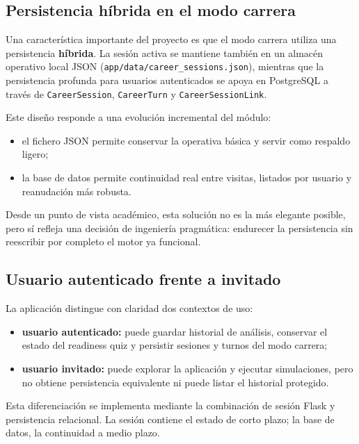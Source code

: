 \subsection{Persistencia híbrida en el modo carrera}

Una característica importante del proyecto es que el modo carrera utiliza una persistencia \textbf{híbrida}. La sesión activa se mantiene también en un almacén operativo local JSON (\texttt{app/data/career\_sessions.json}), mientras que la persistencia profunda para usuarios autenticados se apoya en PostgreSQL a través de \texttt{CareerSession}, \texttt{CareerTurn} y \texttt{CareerSessionLink}.

Este diseño responde a una evolución incremental del módulo:

\begin{itemize}
    \item el fichero JSON permite conservar la operativa básica y servir como respaldo ligero;
    \item la base de datos permite continuidad real entre visitas, listados por usuario y reanudación más robusta.
\end{itemize}

Desde un punto de vista académico, esta solución no es la más elegante posible, pero sí refleja una decisión de ingeniería pragmática: endurecer la persistencia sin reescribir por completo el motor ya funcional.

\subsection{Usuario autenticado frente a invitado}

La aplicación distingue con claridad dos contextos de uso:

\begin{itemize}
    \item \textbf{usuario autenticado:} puede guardar historial de análisis, conservar el estado del readiness quiz y persistir sesiones y turnos del modo carrera;
    \item \textbf{usuario invitado:} puede explorar la aplicación y ejecutar simulaciones, pero no obtiene persistencia equivalente ni puede listar el historial protegido.
\end{itemize}

Esta diferenciación se implementa mediante la combinación de sesión Flask y persistencia relacional. La sesión contiene el estado de corto plazo; la base de datos, la continuidad a medio plazo.

